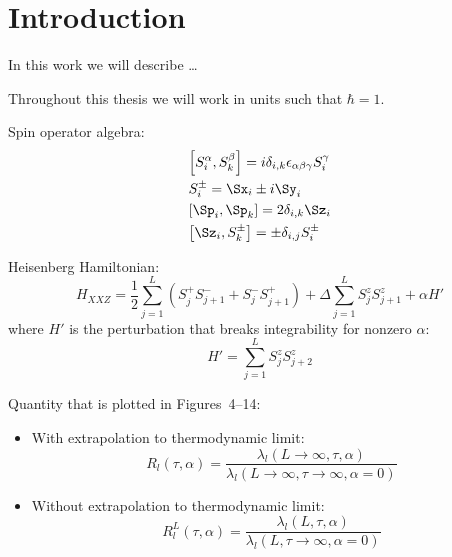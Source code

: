 \chapter{Introduction}
\thispagestyle{chapterBeginStyle}

In this work we will describe \ldots~\autocite{Mierzejewski2015a}

Throughout this thesis we will work in units such that \(\hbar = 1\).

Spin operator algebra:
\begin{align*}
    &\comm{S_{i}^{\alpha}}{S_{k}^{\beta}} = i  \delta_{i,k}\epsilon_{\alpha \beta \gamma} S_{i}^{\gamma}\\
    &S_{i}^{\pm} = \Sx_i \pm i \Sy_i\\
    &\comm{\Sp_i}{\Sp_k} = 2 \delta_{i,k} \Sz_i \\
    &\comm{\Sz_i}{S^{\pm}_k} = \pm \delta_{i,j} S_{i}^{\pm}
\end{align*}

\noindent Heisenberg Hamiltonian:
\begin{equation}
    H_{XXZ} = \frac{1}{2}\sum_{j = 1}^{L}\left( S^{+}_{j} S^{-}_{j+1} + S^{-}_{j}S^{+}_{j+1} \right) + \Delta\sum_{j = 1}^{L} S^{z}_{j}S^{z}_{j+1}
    + \alpha H'
    \label{eq:HXXZ}
\end{equation}
where \(H'\) is the perturbation that breaks integrability for nonzero \(\alpha\):
\begin{equation}
    H'=\sum_{j = 1}^{L} S^{z}_{j}S^{z}_{j+2}
\end{equation}


\noindent Quantity that is plotted in Figures~4--14:
\begin{itemize}
    \item 
    With extrapolation to thermodynamic limit:
    \begin{equation}
        R_l(\tau,\alpha) = \frac{\lambda_l(L\rightarrow \infty,\tau,\alpha)}
        {\lambda_l(L\rightarrow \infty,\tau \rightarrow \infty,\alpha=0)}
        \label{eq:R1 extrap}
    \end{equation}
    \item
    Without extrapolation to thermodynamic limit:
    \begin{equation}
        R^L_l(\tau,\alpha) = \frac{\lambda_l(L,\tau,\alpha)}
        {\lambda_l(L,\tau \rightarrow \infty,\alpha=0)}
        \label{eq:R1 no extrap}
    \end{equation}
\end{itemize}


